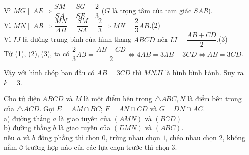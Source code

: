 \begin{ex}
{\begin{itemize}
			Vì $MG \parallel AE \Rightarrow \dfrac{SM}{SA}=\dfrac{SG}{SE}=\dfrac{2}{3}$ ($G$ là trọng tâm của tam giác  $SAB$).\\
			Vì $MN \parallel AB  \Rightarrow \dfrac{MN}{AB}=\dfrac{SM}{SA}=\dfrac{2}{3} \Rightarrow MN=\dfrac{2}{3} AB$.\quad (2)\\
			Vì  $IJ$ là đường trung bình của hình thang $ABCD$ nên $IJ=\dfrac{AB+CD}{2}$.\quad (3)\\
			Từ  (1), (2), (3), ta có
			 $\dfrac{2}{3} AB=\dfrac{A B+C D}{2} \Leftrightarrow 4AB=3AB+3CD \Leftrightarrow AB=3CD$.
		\end{itemize}
		Vậy với hình chóp ban đầu có $AB=3CD$ thì  $MNJI$ là hình bình hành. Suy ra $k=3$.
	 }
\end{ex}

\begin{ex}%
	Cho tứ diện $ ABCD$ và $ M$ là một điểm bên trong $\triangle ABC,N$ là điểm bên trong của $\triangle ACD$. Gọi $ E=AM\cap BC$; $ F=AN\cap CD$ và $ G=DN\cap  AC$.\\
	a) đường thẳng $a$ là giao tuyến của $ (AMN)$ và $ (BCD)$\\ 
	 b) đường thẳng $b$ là giao tuyến của $ (DMN)$ và $ (ABC)$.\\
	nếu $a$ và $b$ đồng phẳng thì chọn $0$, trùng nhau chọn $1$, chéo nhau chọn $2$, không nằm ở trường hợp nào của các lựa chọn trước  thì chọn $3$.
\end{ex}
